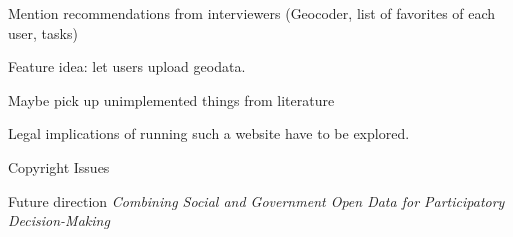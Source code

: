 Mention recommendations from interviewers (Geocoder, list of favorites of each user, tasks)

Feature idea: let users upload geodata.

Maybe pick up unimplemented things from literature

Legal implications of running such a website have to be explored.

Copyright Issues \cite{Carver2001_PPGIS_Cyberdemocracy}


Future direction \textit{Combining Social and Government Open Data for Participatory Decision-Making}
